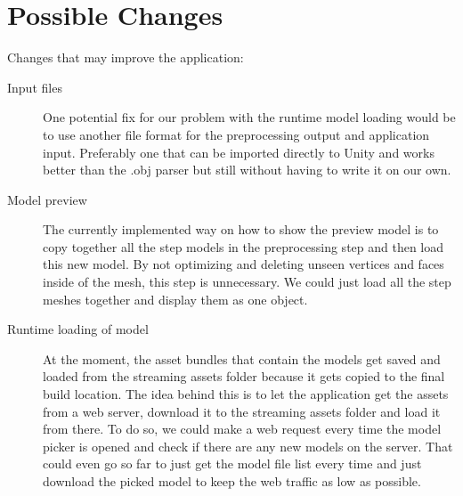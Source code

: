 \section{Possible Changes}
\label{sec:changes}
Changes that may improve the application:
\begin{description}
\item[Input files]
One potential fix for our problem with the runtime model loading would be to use another file format for the preprocessing output and application input. Preferably one that can be imported directly to Unity and works better than the .obj parser but still without having to write it on our own.

\item[Model preview]
The currently implemented way on how to show the preview model is to copy together all the step models in the preprocessing step and then load this new model. By not optimizing and deleting unseen vertices and faces inside of the mesh, this step is unnecessary. We could just load all the step meshes together and display them as one object.

\item[Runtime loading of model] 
At the moment, the asset bundles that contain the models get saved and loaded from the streaming assets folder because it gets copied to the final build location. The idea behind this is to let the application get the assets from a web server, download it to the streaming assets folder and load it from there. To do so, we could make a web request every time the model picker is opened and check if there are any new models on the server. That could even go so far to just get the model file list every time and just download the picked model to keep the web traffic as low as possible.
\end{description}
